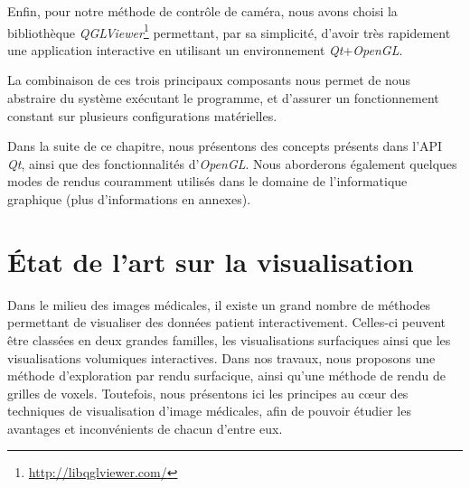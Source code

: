 {	Enfin, pour notre méthode de contrôle de caméra, nous avons choisi la bibliothèque \textit{QGLViewer}\footnote{\url{http://libqglviewer.com/}} permettant, par sa simplicité, d'avoir très rapidement une application interactive en utilisant un environnement \textit{Qt}+\textit{OpenGL}.

	La combinaison de ces trois principaux composants nous permet de nous abstraire du système exécutant le programme, et d'assurer un fonctionnement constant sur plusieurs configurations matérielles.

	Dans la suite de ce chapitre, nous présentons des concepts présents dans l'API \textit{Qt}, ainsi que des fonctionnalités d'\textit{OpenGL}. Nous aborderons également quelques modes de rendus couramment utilisés dans le domaine de l'informatique graphique (plus d'informations en annexes). 

    \section{État de l'art sur la visualisation}
    {
        Dans le milieu des images médicales, il existe un grand nombre de méthodes permettant de visualiser des données patient interactivement. Celles-ci peuvent être classées en deux grandes familles, les visualisations surfaciques ainsi que les visualisations volumiques interactives. Dans nos travaux, nous proposons une méthode d'exploration par rendu surfacique, ainsi qu'une méthode de rendu de grilles de voxels. Toutefois, nous présentons ici les principes au c\oe{}ur des techniques de visualisation d'image médicales, afin de pouvoir étudier les avantages et inconvénients de chacun d'entre eux.

}}
